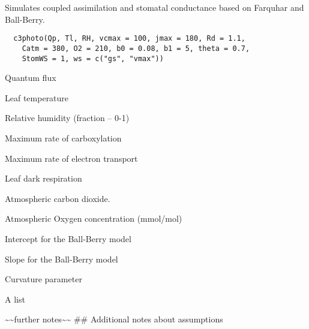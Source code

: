 \documentclass[letterpaper]{book}
\begin{document}
%
\begin{Description}\relax
Simulates coupled assimilation and stomatal conductance
based on Farquhar and Ball-Berry.
\end{Description}
%
\begin{Usage}
\begin{verbatim}
  c3photo(Qp, Tl, RH, vcmax = 100, jmax = 180, Rd = 1.1,
    Catm = 380, O2 = 210, b0 = 0.08, b1 = 5, theta = 0.7,
    StomWS = 1, ws = c("gs", "vmax"))
\end{verbatim}
\end{Usage}
%
\begin{Arguments}
\begin{ldescription}
\item[\code{Qp}] Quantum flux

\item[\code{Tl}] Leaf temperature

\item[\code{RH}] Relative humidity (fraction -- 0-1)

\item[\code{vcmax}] Maximum rate of carboxylation

\item[\code{jmax}] Maximum rate of electron transport

\item[\code{Rd}] Leaf dark respiration

\item[\code{Catm}] Atmospheric carbon dioxide.

\item[\code{O2}] Atmospheric Oxygen concentration (mmol/mol)

\item[\code{b0}] Intercept for the Ball-Berry model

\item[\code{b1}] Slope for the Ball-Berry model

\item[\code{theta}] Curvature parameter
\end{ldescription}
\end{Arguments}
%
\begin{Value}
A list
\end{Value}
%
\begin{Note}\relax
\textasciitilde{}\textasciitilde{}further notes\textasciitilde{}\textasciitilde{} \#\# Additional notes about assumptions
\end{Note}
\end{document}
